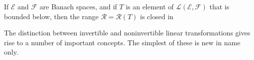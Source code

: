 If $\mathcal{E}$ and $\mathcal{F}$ are Banach spaces, and if $T$ is an element of $\mathcal{L}(\mathcal{E}, \mathcal{F})$ that is bounded below, then the range $\mathcal{R} = \mathcal{R}(T)$ is closed in

The distinction between invertible and noninvertible linear transformations gives rise to a number of important concepts. The simplest of these is new in name only.
